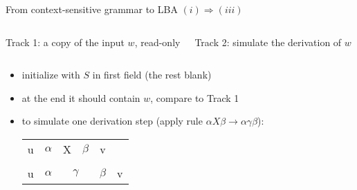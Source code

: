 \documentclass[handout]{beamer}
\begin{document}
\begin{frame}{From context-sensitive grammar to LBA \hfill $(i)\Rightarrow(iii)$}

    \begin{columns}



        \alert{Track 1}: a copy of the input $w$, read-only

        \alert{Track 2}: simulate the derivation of $w$ %
        
    
        \vspace{11pt}


        
    \end{columns}

    \begin{itemize}
        \item initialize with $S$ in first field (the rest blank)
        \item at the end it should contain $w$, compare to Track 1  
        
        \bigskip
        
        \item to simulate one derivation step (apply rule $\alpha X \beta \rightarrow \alpha \gamma \beta$):

        \smallskip
        \begin{center}
            \begin{tabular}{c c c  c c c}
            \cline{1-5}
            \multicolumn{1}{|c|}{u} & $\alpha$ & \multicolumn{1}{|c|}{X} & $\beta$& \multicolumn{1}{|c|}{v} &\\ \cline{1-5}
            \vspace{0.005cm}\\ \cline{1-6}
            \multicolumn{1}{|c|}{u} & $\alpha$ & \multicolumn{2}{|c|}{$\gamma$} & $\beta$& \multicolumn{1}{|c|}{v} \\ \cline{1-6}
            \end{tabular}
        \end{center}
        \smallskip
    

\end{itemize}
\end{frame}
\end{document}
